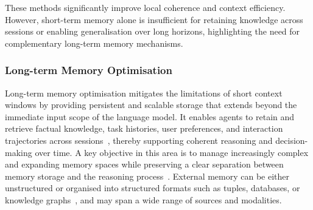 \documentclass[]{selfevolagent}
\theoremstyle{plain}
\theoremstyle{definition}
\theoremstyle{remark}
\begin{document}
These methods significantly improve local coherence and context efficiency. However, short-term memory alone is insufficient for retaining knowledge across sessions or enabling generalisation over long horizons, highlighting the need for complementary long-term memory mechanisms.

\subsubsection{Long-term Memory Optimisation}
Long-term memory optimisation mitigates the limitations of short context windows by providing persistent and scalable storage that extends beyond the immediate input scope of the language model. It enables agents to retain and retrieve factual knowledge, task histories, user preferences, and interaction trajectories across sessions~\citep{du2025rethinkingmemoryaitaxonomy}, thereby supporting coherent reasoning and decision-making over time. A key objective in this area is to manage increasingly complex and expanding memory spaces while preserving a clear separation between memory storage and the reasoning process~\citep{zhang2024survey}. External memory can be either unstructured or organised into structured formats such as tuples, databases, or knowledge graphs~\citep{zeng2024structuralmemoryllmagents}, and may span a wide range of sources and modalities.
\end{document}
